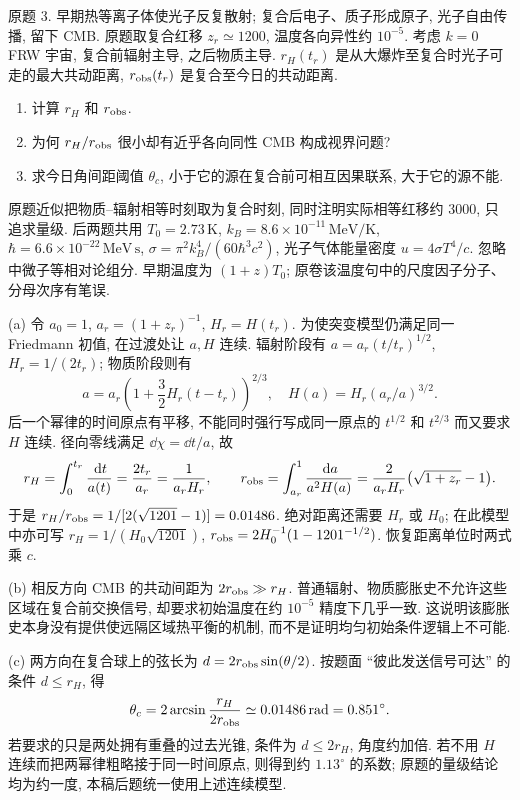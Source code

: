 \begin{exercise}\label{ps:9.3}
原题 3. 早期热等离子体使光子反复散射; 复合后电子、质子形成原子, 光子自由传播, 留下 CMB. 原题取复合红移 $z_r\simeq1200$, 温度各向异性约 $10^{-5}$. 考虑 $k=0$ FRW 宇宙, 复合前辐射主导, 之后物质主导. $r_H(t_r)$ 是从大爆炸至复合时光子可走的最大共动距离, $r_{\rm obs}(t_r)$ 是复合至今日的共动距离.
\begin{enumerate}[label=(\alph*)]
\item 计算 $r_H$ 和 $r_{\rm obs}$.
\item 为何 $r_H/r_{\rm obs}$ 很小却有近乎各向同性 CMB 构成视界问题?
\item 求今日角间距阈值 $\theta_c$, 小于它的源在复合前可相互因果联系, 大于它的源不能.
\end{enumerate}
原题近似把物质--辐射相等时刻取为复合时刻, 同时注明实际相等红移约 3000, 只追求量级. 后两题共用 $T_0=2.73\,\mathrm K$, $k_B=8.6\times10^{-11}\,\mathrm{MeV/K}$, $\hbar=6.6\times10^{-22}\,\mathrm{MeV\,s}$,
$\sigma=\pi^2k_B^4/(60\hbar^3c^2)$, 光子气体能量密度 $u=4\sigma T^4/c$. 忽略中微子等相对论组分. 早期温度为 $(1+z)T_0$; 原卷该温度句中的尺度因子分子、分母次序有笔误.
\end{exercise}
\begin{solution}
(a) 令 $a_0=1$, $a_r=(1+z_r)^{-1}$, $H_r=H(t_r)$. 为使突变模型仍满足同一 Friedmann 初值, 在过渡处让 $a,H$ 连续. 辐射阶段有 $a=a_r(t/t_r)^{1/2}$, $H_r=1/(2t_r)$; 物质阶段则有
\[
a=a_r\left(1+\frac32H_r(t-t_r)\right)^{2/3},\quad
H(a)=H_r(a_r/a)^{3/2}.
\]
后一个幂律的时间原点有平移, 不能同时强行写成同一原点的 $t^{1/2}$ 和 $t^{2/3}$ 而又要求 $H$ 连续. 径向零线满足 $\dd\chi=\dd t/a$, 故
\[
r_H=\int_0^{t_r}\frac{\,\mathrm d t}{a(t)}=\frac{2t_r}{a_r}=\frac1{a_rH_r},\qquad
r_{\rm obs}=\int_{a_r}^{1}\frac{\,\mathrm d a}{a^2H(a)}=
\frac{2}{a_rH_r}\bigl(\sqrt{1+z_r}-1\bigr).
\]
于是 $r_H/r_{\rm obs}=1/[2(\sqrt{1201}-1)]=0.01486$. 绝对距离还需要 $H_r$ 或 $H_0$; 在此模型中亦可写 $r_H=1/(H_0\sqrt{1201})$, $r_{\rm obs}=2H_0^{-1}(1-1201^{-1/2})$. 恢复距离单位时两式乘 $c$.

(b) 相反方向 CMB 的共动间距为 $2r_{\rm obs}\gg r_H$. 普通辐射、物质膨胀史不允许这些区域在复合前交换信号, 却要求初始温度在约 $10^{-5}$ 精度下几乎一致. 这说明该膨胀史本身没有提供使远隔区域热平衡的机制, 而不是证明均匀初始条件逻辑上不可能.

(c) 两方向在复合球上的弦长为 $d=2r_{\rm obs}\sin(\theta/2)$. 按题面 ``彼此发送信号可达'' 的条件 $d\le r_H$, 得
\[
\theta_c=2\arcsin\frac{r_H}{2r_{\rm obs}}\simeq0.01486\,\mathrm{rad}=0.851^\circ.
\]
若要求的只是两处拥有重叠的过去光锥, 条件为 $d\le2r_H$, 角度约加倍. 若不用 $H$ 连续而把两幂律粗略接于同一时间原点, 则得到约 $1.13^\circ$ 的系数; 原题的量级结论均为约一度, 本稿后题统一使用上述连续模型.
\end{solution}

